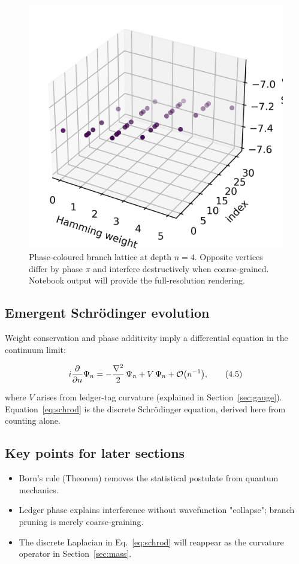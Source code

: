\begin{figure}[t]
  \centering
  \includegraphics[width=\linewidth]{figs/branch_lattice.png}
  \caption{Phase-coloured branch lattice at depth
           $n=4$.  Opposite vertices differ by phase $\pi$ and interfere
           destructively when coarse-grained.  Notebook output will provide the full-resolution rendering.}
  \label{fig:branch-lattice}
\end{figure}

\subsection{Emergent Schrödinger evolution}

Weight conservation and phase additivity imply a differential equation
in the continuum limit:

\[
  i\frac{\partial}{\partial n}\Psi_n
  =-\frac{\nabla^2}{2}\,\Psi_n + V\,\Psi_n + \order{n^{-1}},
\tag{4.5}\label{eq:schrod}
\]

where $V$ arises from ledger-tag curvature (explained in
Section~\ref{sec:gauge}).  Equation~\eqref{eq:schrod} is the discrete
Schrödinger equation, derived here from counting alone.

\subsection{Key points for later sections}

\begin{itemize}
  \item Born's rule (Theorem) removes the statistical postulate from
        quantum mechanics.
  \item Ledger phase explains interference without wavefunction
        "collapse"; branch pruning is merely coarse-graining.
  \item The discrete Laplacian in Eq.~\eqref{eq:schrod} will reappear
        as the curvature operator in Section~\ref{sec:mass}.
\end{itemize}

\clearpage
